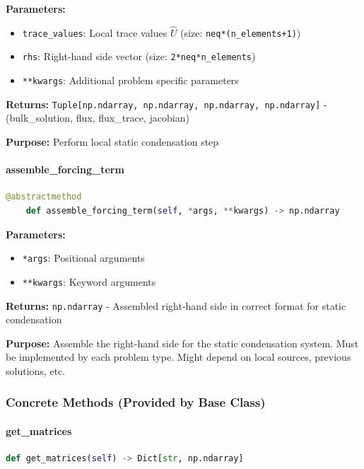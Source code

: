 \textbf{Parameters:}
\begin{itemize}
    \item \texttt{trace\_values}: Local trace values $\hat{U}$ (size: \texttt{neq*(n\_elements+1)})
    \item \texttt{rhs}: Right-hand side vector (size: \texttt{2*neq*n\_elements})
    \item \texttt{**kwargs}: Additional problem specific parameters
\end{itemize}

\textbf{Returns:} \texttt{Tuple[np.ndarray, np.ndarray, np.ndarray, np.ndarray]} - (bulk\_solution, flux,  flux\_trace, jacobian)

\textbf{Purpose:} Perform local static condensation step


\paragraph{assemble\_forcing\_term}\leavevmode
\begin{lstlisting}[language=Python, caption=Abstract Static Condensation forcing term assembly]
	@abstractmethod
	def assemble_forcing_term(self, *args, **kwargs) -> np.ndarray
\end{lstlisting}

\textbf{Parameters:}
\begin{itemize}
	\item \texttt{*args}: Positional arguments
	\item \texttt{**kwargs}: Keyword arguments
\end{itemize}

\textbf{Returns:} \texttt{np.ndarray} - Assembled right-hand side in correct format for static condensation

\textbf{Purpose:} Assemble the right-hand side for the static condensation system.
Must be implemented by each problem type. Might depend on local sources, previous solutions, etc.


\subsubsection{Concrete Methods (Provided by Base Class)}

\paragraph{get\_matrices}\leavevmode
\begin{lstlisting}[language=Python, caption=Get Matrices]
def get_matrices(self) -> Dict[str, np.ndarray]
\end{lstlisting}

